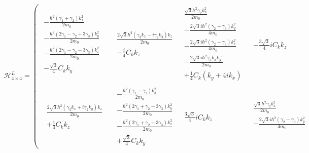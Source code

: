 \begin{align}
 \mathcal{H}_{4\times4}^L =\left(
 \begin{array}{c|c|c|c}
\begin{array}{c}
-\frac{\hbar^2(\gamma_1 +\gamma_2)k_x^2}{2m_0}\\
-\frac{\hbar^2(2\gamma_1-\gamma_2+3\gamma_3)k_y^2}{2m_0}\\
-\frac{\hbar^2(2\gamma_1-\gamma_2-3\gamma_3)k_z^2}{2m_0}\\
-\frac{\sqrt{3}}{4}C_kk_y
\end{array}
&\begin{array}{c}
 \frac{2\sqrt{3}\hbar^2(\gamma_3k_x -i\gamma_2k_y)k_z}{2m_0} \\
-\frac{i}{4}C_kk_z
\end{array}
&\begin{array}{c}
\frac{\sqrt{3}\hbar^2\gamma_2k_x^2}{2m_0} \\
-\frac{2\sqrt{3}i\hbar^2(\gamma_2-\gamma_3)k_y^2}{4m_0}\\
-\frac{2\sqrt{3}i\hbar^2(\gamma_2-\gamma_3)k_z^2}{4m_0}\\
-\frac{2\sqrt{3}i\hbar^2\gamma_3k_xk_y{'}}{2m_0}\\
+\frac{1}{4} C_k(k_y + 4ik_x)
\end{array}
&\begin{array}{c}
-\frac{3\sqrt{3}}{4}iC_kk_z
\end{array}
\\ \hline %
\begin{array}{c}
\begin{array}{c}
 \frac{2\sqrt{3}\hbar^2(\gamma_3k_x +i\gamma_2k_y)k_z}{2m_0} \\
+\frac{1}{4}C_kk_z
\end{array}
\end{array}
&\begin{array}{c}
 -\frac{\hbar^2(\gamma_1-\gamma_2)k_x^2}{2m_0}\\
-\frac{\hbar^2(2\gamma_1+\gamma_2-3\gamma_3)k_y^2}{2m_0}\\
-\frac{\hbar^2(2\gamma_1+\gamma_2+3\gamma_3)k_z^2}{2m_0}\\
+\frac{\sqrt{3}}{4}C_kk_y
\end{array}
&\begin{array}{c}
\frac{3\sqrt{3}}{4}iC_kk_z
\end{array}
&\begin{array}{c}
\frac{\sqrt{3}\hbar^2\gamma_2k_x^2}{2m_0} \\
-\frac{2\sqrt{3}i\hbar^2(\gamma_2-\gamma_3)k_y^2}{4m_0}\\

\end{array}
\end{array}
\end{align}
